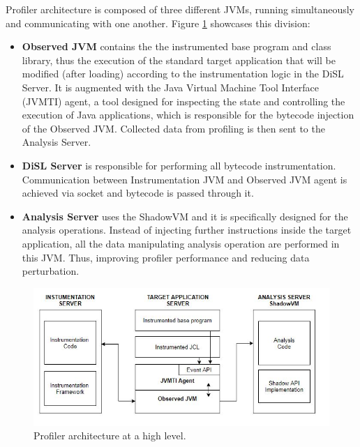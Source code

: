\documentclass[]{usiinfthesis}
\begin{document}
Profiler architecture is composed of three different JVMs, running simultaneously and communicating with one another. Figure \ref{fig:1} showcases this division:
\begin{itemize}
    \item \textbf{Observed JVM} contains the the instrumented base program and class library, thus the execution of the standard target application that will be modified (after loading) according to the instrumentation logic in the DiSL Server. It is augmented with the Java Virtual Machine Tool Interface (JVMTI) agent, a tool designed for inspecting the state and controlling the execution of Java applications, which is responsible for the bytecode injection of the Observed JVM. Collected data from profiling is then sent to the Analysis Server.
    \item \textbf{DiSL Server} is responsible for performing all bytecode instrumentation. Communication between Instrumentation JVM and Observed JVM agent is achieved via socket and bytecode is passed through it.
    \item \textbf{Analysis Server} uses the ShadowVM and it is specifically designed for the analysis operations. Instead of injecting further instructions inside the target application, all the data manipulating analysis operation are performed in this JVM. Thus, improving profiler performance and reducing data perturbation.
\end{itemize}

\begin{figure}
    \centering
    \includegraphics[scale=0.7]{Immagini/DiSL_Architecture.JPG} 
    \caption[Profiler Architecture]{Profiler architecture at a high level.}
    \label{fig:1}
\end{figure}
\end{document}
